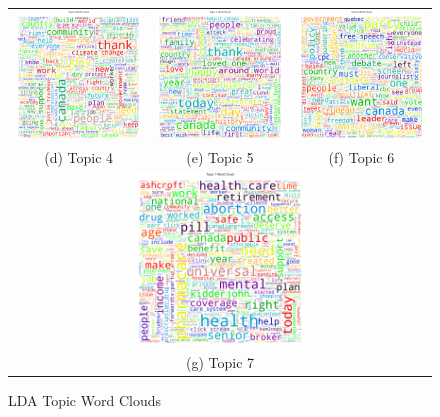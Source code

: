 \begin{singlespacing}
\begin{figure}
\begin{tabular}{ccc}
        \includegraphics[width=45mm]{Figures/topic_4_wordcloud} &
        \includegraphics[width=45mm]{Figures/topic_5_wordcloud} &
        \includegraphics[width=45mm]{Figures/topic_6_wordcloud} \\
        (d) Topic 4 & (e) Topic 5 & (f) Topic 6  \\[6pt]
        \multicolumn{3}{c}{\includegraphics[width=45mm]{Figures/topic_7_wordcloud}
        }\\
        \multicolumn{3}{c}{(g) Topic 7}
        \end{tabular}
        \caption[LDA Topic Word Clouds]{LDA Topic Word Clouds}
        \label{fig:topic_word_clouds}
    \end{figure}
\end{singlespacing}


